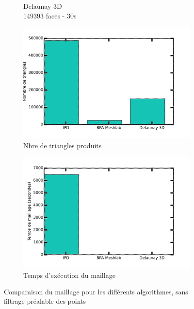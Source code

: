 \documentclass[a4paper,10pt]{report}
\begin{document}
\begin{figure}[h!]
\begin{subfigure}[b]{0.3\textwidth}
        \caption{Delaunay 3D\\149393 faces - 30s}
    \end{subfigure}
    \begin{subfigure}[b]{0.3\textwidth}
	    \includegraphics[width=\textwidth]{results/algos-nodp-triangles-cmp.png}
        \caption{Nbre de triangles produits}
    \end{subfigure}
    \begin{subfigure}[b]{0.3\textwidth}
	    \includegraphics[width=\textwidth]{results/algos-nodp-time-cmp.png}
        \caption{Temps d'exécution du maillage}
    \end{subfigure}
    \caption{\label{fig:meshcmp2}Comparaison du maillage pour les différents algorithmes, sans filtrage préalable des points}
\end{figure}
\end{document}
